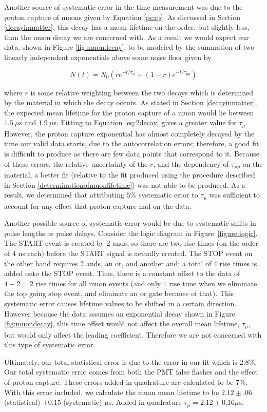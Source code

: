 Another source of systematic error in the time measurement was due to the proton capture of muons given by Equation \eqref{pcap}.  As discussed in Section \ref{decayinmatter}, this decay has a mean lifetime on the order, but slightly less, than the muon decay we are concerned with.  As a result we would expect our data, shown in Figure \ref{fig:muondecay}, to be modeled by the summation of two linearly independent exponentials above some noise floor given by

\begin{center}
\begin{equation}
\label{eq:2decay}
N(t)=N_{0}(r e^{-t/\tau_{\mu}}+(1-r)e^{-t/\tau_{\mu p}})
\end{equation}
\end{center}

where $r$ is some relative weighting between the two decays which is determined by the material in which the decay occurs.  As stated in Section \ref{decayinmatter}, the expected mean lifetime for the proton capture of a muon would lie between $1.5~\mu$s and $1.9~\mu$s.  Fitting to Equation \eqref{eq:2decay} gives a greater value for $\tau_{\mu}$. However, the proton capture exponential has almost completely decayed by the time our valid data starts, due to the autocorrelation errors; therefore, a good fit is difficult to produce as there are few data points that correspond to it. Because of these errors, the relative uncertainty of the $r$, and the dependency of $\tau_{\mu p}$ on the material, a better fit (relative to the fit produced using the procedure described in Section \ref{determinationofmuonlifetime}) was not able to be produced. As a result, we determined that attributing $5\%$ systematic error to $\tau_{\mu}$ was sufficient to account for any effect that proton capture had on the data. 

Another possible source of systematic error would be due to systematic shifts in pulse lengths or pulse delays. Consider the logic diagram in Figure~\ref{figure:logic}. The START event is created by 2 ands, so there are two rise times (on the order of $4$ ns each) before the START signal is actually created. The STOP event on the other hand requires 2 ands, an or, and another and; a total of 4 rise times is added onto the STOP event. Thus, there is a constant offset to the data of $4-2=2$ rise times for all muon events (and only $1$ rise time when we eliminate the top going stop event, and eliminate an or gate because of that). This systematic error causes lifetime values to be shifted in a certain direction.  However because the data assumes an exponential decay shown in Figure \ref{fig:muondecay}, this time offset would not affect the overall mean lifetime, $\tau_{\mu}$, but would only affect the leading coefficient. Therefore we are not concerned with this type of systematic error.

Ultimately, our total statistical error is due to the error in our fit which is $2.8\%$.  Our total systematic error comes from both the PMT false flashes and the effect of proton capture.  These errors added in quadrature are calculated to be $7\%$.  With this error included, we calculate the muon mean lifetime to be $2.12\pm.06$ (statistical) $\pm0.15$ (systematic) $\mu$s.  Added in quadrature $\tau_{\mu}=2.12\pm0.16\mu$s.
